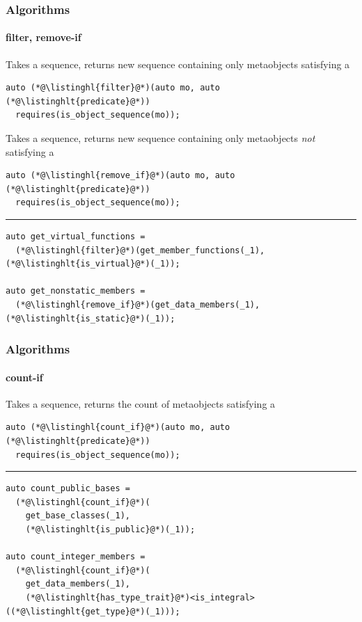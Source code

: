 \documentclass[aspectratio=169,compress,table,xcolor=table]{beamer}
\begin{document}
\begin{frame}[fragile]
  \frametitle{Algorithms}
  \framesubtitle{filter, remove-if}
  Takes a sequence, returns new sequence containing only metaobjects
  satisfying a 
  \begin{lstlisting}[language=c++2x]
auto (*@\listinghl{filter}@*)(auto mo, auto (*@\listinghlt{predicate}@*))
  requires(is_object_sequence(mo));
  \end{lstlisting}
  \vfill
  Takes a sequence, returns new sequence containing only metaobjects
  {\em not} satisfying a 
  \begin{lstlisting}[language=c++2x]
auto (*@\listinghl{remove_if}@*)(auto mo, auto (*@\listinghlt{predicate}@*))
  requires(is_object_sequence(mo));
  \end{lstlisting}
  \hrule
  \vfill
  \begin{lstlisting}[language=c++2x,basicstyle=\small\ttfamily]
auto get_virtual_functions =
  (*@\listinghl{filter}@*)(get_member_functions(_1), (*@\listinghlt{is_virtual}@*)(_1));

auto get_nonstatic_members =
  (*@\listinghl{remove_if}@*)(get_data_members(_1), (*@\listinghlt{is_static}@*)(_1));
  \end{lstlisting}
\end{frame}
\begin{frame}[fragile]
  \frametitle{Algorithms}
  \framesubtitle{count-if}
  Takes a sequence, returns the count of metaobjects satisfying
  a 
  \begin{lstlisting}[language=c++2x]
auto (*@\listinghl{count_if}@*)(auto mo, auto (*@\listinghlt{predicate}@*))
  requires(is_object_sequence(mo));
  \end{lstlisting}
  \hrule
  \vfill
  \begin{lstlisting}[language=c++2x,basicstyle=\small\ttfamily]
auto count_public_bases =
  (*@\listinghl{count_if}@*)(
    get_base_classes(_1),
    (*@\listinghlt{is_public}@*)(_1));

auto count_integer_members =
  (*@\listinghl{count_if}@*)(
    get_data_members(_1),
    (*@\listinghlt{has_type_trait}@*)<is_integral>((*@\listinghlt{get_type}@*)(_1)));
  \end{lstlisting}
\end{frame}
\end{document}
